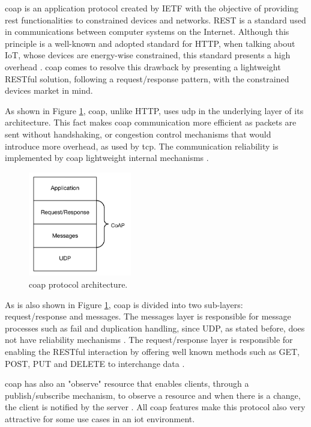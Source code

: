 \acf{coap} is an application protocol created by IETF with the objective of providing \acf{rest} functionalities to constrained devices and networks. REST is a standard used in communications between computer systems on the Internet. Although this principle is a well-known and adopted standard for HTTP, when talking about IoT, whose devices are energy-wise constrained, this standard presents a high overhead \cite{Salman2013}. \ac{coap} comes to resolve this drawback by presenting a lightweight RESTful solution, following a request/response pattern, with the constrained devices market in mind.

As shown in Figure \ref{fig:coap}, \ac{coap}, unlike HTTP, uses \ac{udp} in the underlying layer of its architecture. This fact makes \ac{coap} communication more efficient as packets are sent without handshaking, or congestion control mechanisms that would introduce more overhead, as used by \acf{tcp}. The communication reliability is implemented by \ac{coap} lightweight internal mechanisms \cite{Salman2013}.

\begin{figure}[H]
	\centering
	\includegraphics[width=0.4\textwidth]{figures/coap.png}
	\caption{\ac{coap} protocol architecture.}
	\label{fig:coap}
\end{figure}

As is also shown in Figure \ref{fig:coap}, \ac{coap} is divided into two sub-layers: request/response and messages. The messages layer is responsible for message processes such as fail and duplication handling, since UDP, as stated before, does not have reliability mechanisms \cite{Salman2013}. The request/response layer is responsible for enabling the RESTful interaction by offering well known methods such as GET, POST, PUT and DELETE to interchange data \cite{Lerche2012}.

\ac{coap} has also an "observe" resource that enables clients, through a publish/subscribe mechanism, to observe a resource and when there is a change, the client is notified by the server \cite{Lerche2012}. All \ac{coap} features make this protocol also very attractive for some use cases in an \ac{iot} environment.


